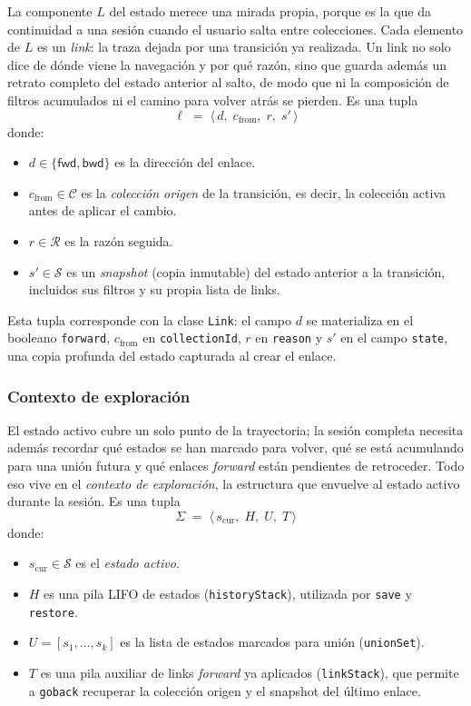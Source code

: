 La componente $L$ del estado merece una mirada propia, porque es la que da continuidad a una sesión cuando
el usuario salta entre colecciones. Cada elemento de $L$ es un \emph{link}: la traza dejada por una
transición ya realizada. Un link no solo dice de dónde viene la navegación y por qué razón, sino que
guarda además un retrato completo del estado anterior al salto, de modo que ni la composición de filtros
acumulados ni el camino para volver atrás se pierden. Es una tupla
\[
  \ell \;=\; \langle\, d,\; c_{\text{from}},\; r,\; s' \,\rangle
\]
donde:
\begin{itemize}
  \item $d \in \{\mathsf{fwd}, \mathsf{bwd}\}$ es la dirección del enlace.
  \item $c_{\text{from}} \in \mathcal{C}$ es la \emph{colección origen} de la transición, es decir, la
    colección activa antes de aplicar el cambio.
  \item $r \in \mathcal{R}$ es la razón seguida.
  \item $s' \in \mathcal{S}$ es un \emph{snapshot} (copia inmutable) del estado anterior a la transición,
    incluidos sus filtros y su propia lista de links.
\end{itemize}

Esta tupla corresponde con la clase \texttt{Link}: el campo $d$ se materializa en el booleano
\texttt{forward}, $c_{\text{from}}$ en \texttt{collectionId}, $r$ en \texttt{reason} y $s'$ en el campo
\texttt{state}, una copia profunda del estado capturada al crear el enlace.

\subsubsection*{Contexto de exploración}

El estado activo cubre un solo punto de la trayectoria; la sesión completa necesita además recordar qué
estados se han marcado para volver, qué se está acumulando para una unión futura y qué enlaces \emph{forward}
están pendientes de retroceder. Todo eso vive en el \emph{contexto de exploración}, la estructura que envuelve
al estado activo durante la sesión. Es una tupla
\[
  \Sigma \;=\; \langle\, s_{\text{cur}},\; H,\; U,\; T \,\rangle
\]
donde:
\begin{itemize}
  \item $s_{\text{cur}} \in \mathcal{S}$ es el \emph{estado activo}.
  \item $H$ es una pila LIFO de estados (\texttt{historyStack}), utilizada por \texttt{save} y \texttt{restore}.
  \item $U = [s_{1}, \ldots, s_{k}]$ es la lista de estados marcados para unión (\texttt{unionSet}).
  \item $T$ es una pila auxiliar de links \emph{forward} ya aplicados (\texttt{linkStack}), que permite a
    \texttt{goback} recuperar la colección origen y el snapshot del último enlace.
\end{itemize}

